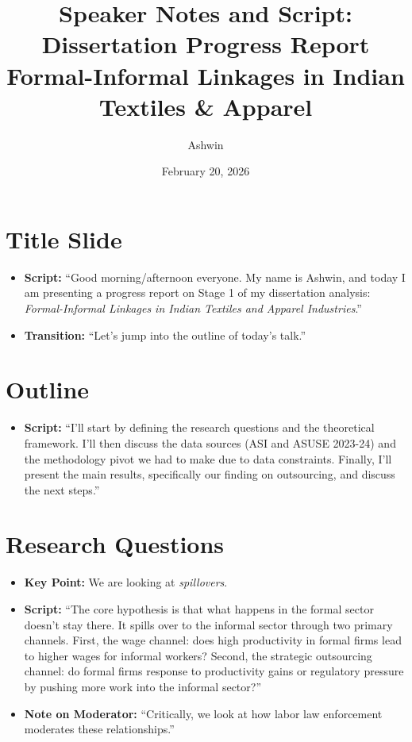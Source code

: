 \documentclass[11pt]{article}
\title{Speaker Notes and Script: Dissertation Progress Report\\ \large Formal-Informal Linkages in Indian Textiles \& Apparel}
\author{Ashwin}
\date{February 20, 2026}
\begin{document}
\maketitle

\section{Title Slide}
\begin{itemize}
    \item \textbf{Script:} ``Good morning/afternoon everyone. My name is Ashwin, and today I am presenting a progress report on Stage 1 of my dissertation analysis: \textit{Formal-Informal Linkages in Indian Textiles and Apparel Industries}.''
    \item \textbf{Transition:} ``Let's jump into the outline of today's talk.''
\end{itemize}

\section{Outline}
\begin{itemize}
    \item \textbf{Script:} ``I'll start by defining the research questions and the theoretical framework. I'll then discuss the data sources (ASI and ASUSE 2023-24) and the methodology pivot we had to make due to data constraints. Finally, I'll present the main results, specifically our finding on outsourcing, and discuss the next steps.''
\end{itemize}

\section{Research Questions}
\begin{itemize}
    \item \textbf{Key Point:} We are looking at \textit{spillovers}.
    \item \textbf{Script:} ``The core hypothesis is that what happens in the formal sector doesn't stay there. It spills over to the informal sector through two primary channels. First, the wage channel: does high productivity in formal firms lead to higher wages for informal workers? Second, the strategic outsourcing channel: do formal firms response to productivity gains or regulatory pressure by pushing more work into the informal sector?''
    \item \textbf{Note on Moderator:} ``Critically, we look at how labor law enforcement moderates these relationships.''
\end{itemize}
\end{document}
